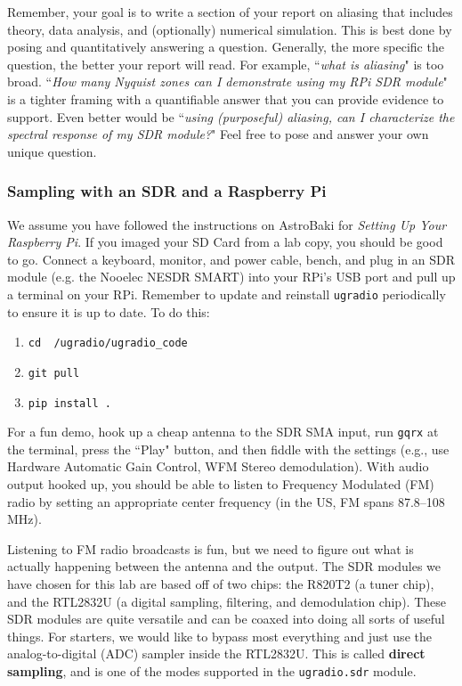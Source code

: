 \documentclass[11pt,preprint]{aastex}
\begin{document}
Remember, your goal is to write a section of your report on aliasing
that includes theory, data analysis, and (optionally) numerical
simulation.
This is best done by posing and quantitatively answering a question.
Generally, the more specific the
question, the better your report will read. For example, ``{\it what
is aliasing}" is too broad. ``{\it How many Nyquist zones
can I demonstrate using my RPi SDR module}" is a tighter framing with
a quantifiable answer that you can provide evidence to support. Even better
would be ``{\it using (purposeful) aliasing, can I characterize
the spectral response of my SDR module?}"
Feel free to pose and answer your own unique question.

\subsubsection{Sampling with an SDR and a Raspberry Pi}

\noindent
We assume you have followed the instructions on AstroBaki for 
{\it Setting Up Your Raspberry Pi}.
If you imaged your SD Card from a lab copy, you should be good to go.
Connect a keyboard, monitor, and power cable,
bench, and plug in an SDR module 
(e.g. the Nooelec NESDR SMART) into your RPi's USB port and pull up a 
terminal on your RPi.
Remember to update and reinstall {\tt ugradio} periodically 
to ensure it is up to date. To do this:
\begin{enumerate}
\item {\tt cd ~/ugradio/ugradio\_code}
\item {\tt git pull}
\item {\tt pip install .}
\end{enumerate}

For a fun demo, hook up a cheap antenna to the SDR SMA input,
run {\tt gqrx} at the terminal, press the ``Play" button, and then fiddle with the
settings (e.g., use Hardware Automatic Gain Control, WFM Stereo demodulation). 
With audio output hooked up, 
you should be able to listen to Frequency Modulated (FM) 
radio by setting an appropriate center frequency (in the US, FM spans
87.8--108 MHz).

Listening to FM radio broadcasts is fun, but we need to figure out
what is actually happening between the antenna and the output.
The SDR modules we have chosen for this
lab are based off of two chips: the R820T2 (a tuner chip), and the RTL2832U (a digital
sampling, filtering, and demodulation chip).
These SDR modules are quite versatile and can be 
coaxed into doing all sorts of useful things. 
For starters, we would like to bypass most everything
and just use the analog-to-digital (ADC) sampler
inside the RTL2832U. This is called {\bf direct sampling}, and is one
of the modes supported in the 
{\tt ugradio.sdr} module.
\end{document}
